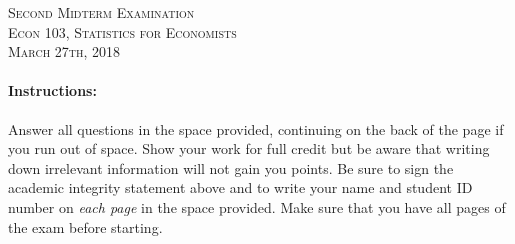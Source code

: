 \documentclass[addpoints,12pt]{exam}
\begin{document}
\begin{center}
\textsc{\large Second Midterm Examination\\ \normalsize Econ 103, Statistics for Economists \\ \vspace{0.5em} March 27th, 2018}

\vspace{2em}



\end{center}


\vspace{2em}
\begin{center}
\end{center}
\vspace{0.2in}

\vspace{0.2in}

\noindent{}

\vspace{0.2in}

\noindent{}
\hfill
{}

\vspace{2em}

\begin{center}
  \gradetable[h][questions]
\end{center}

\vspace{2em}

\paragraph{Instructions:} Answer all questions in the space provided, continuing on the back of the page if you run out of space. Show your work for full credit but be aware that writing down irrelevant information will not gain you points. Be sure to sign the academic integrity statement above and to write your name and student ID number on \emph{each page} in the space provided. Make sure that you have all pages of the exam before starting.
\end{document}
